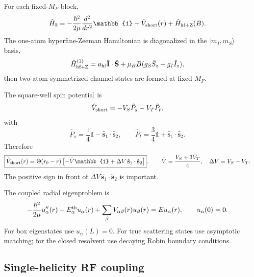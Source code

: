\documentclass[11pt,a4paper]{article}
\newcommand{\ket}[1]{\lvert #1 \rangle}
\newcommand{\one}{\mathbb{1}}
\begin{document}
For each fixed-$M_F$ block,
\begin{equation}
\hat H_0=-\frac{\hbar^2}{2\mu}\frac{d^2}{dr^2}\one + \hat V_{\rm short}(r)+\hat H_{\rm hf+Z}(B).
\end{equation}
The one-atom hyperfine-Zeeman Hamiltonian is diagonalized in the
$\ket{m_I,m_S}$ basis,
\begin{equation}
\hat H_{\rm hf+Z}^{(1)}=a_{\rm hf}\hat{\mathbf I}\cdot\hat{\mathbf S}
+\mu_B B(g_S\hat S_z+g_I\hat I_z),
\end{equation}
then two-atom symmetrized channel states are formed at fixed $M_F$.

The square-well spin potential is
\begin{equation}
\hat V_{\rm short}= -V_S\hat P_s-V_T\hat P_t,
\end{equation}
with
\begin{equation}
\hat P_s=\frac14\one-\hat{\mathbf s}_1\cdot\hat{\mathbf s}_2,
\qquad
\hat P_t=\frac34\one+\hat{\mathbf s}_1\cdot\hat{\mathbf s}_2.
\end{equation}
Therefore
\begin{equation}
\boxed{\hat V_{\rm short}(r)=\Theta(r_0-r)
\left[-\bar V\one+\Delta V\,\hat{\mathbf s}_1\cdot\hat{\mathbf s}_2\right]},
\qquad
\bar V=\frac{V_S+3V_T}{4},\quad \Delta V=V_S-V_T.
\end{equation}
The positive sign in front of $\Delta V\,\hat{\mathbf s}_1\cdot\hat{\mathbf s}_2$
is important.

The coupled radial eigenproblem is
\begin{equation}
-\frac{\hbar^2}{2\mu}u_\alpha''(r)+E_\alpha^{\rm th}u_\alpha(r)
+\sum_\beta V_{\alpha\beta}(r)u_\beta(r)=E u_\alpha(r),
\qquad u_\alpha(0)=0.
\end{equation}
For box eigenstates use $u_\alpha(L)=0$.  For true scattering states use
asymptotic matching; for the closed resolvent use decaying Robin boundary
conditions.

\subsection{Single-helicity RF coupling}
\end{document}
